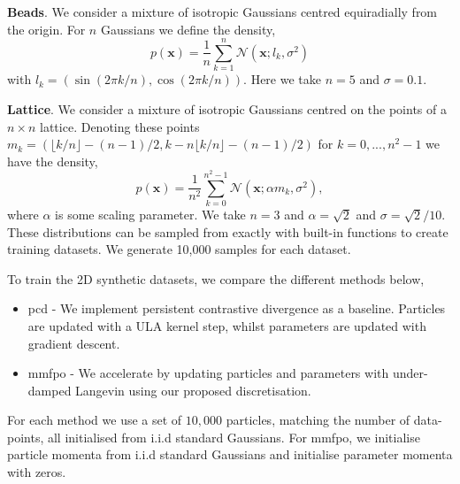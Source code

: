 \textbf{Beads}. We consider a mixture of isotropic Gaussians centred equiradially from the origin. For $n$ Gaussians we define the density,
\begin{equation*}
    p(\mathbf{x})=\frac{1}{n}\sum_{k=1}^n\mathcal{N}(\mathbf{x}; l_k,\sigma^2)
\end{equation*}
with $l_k=(\sin(2\pi k/n),\cos(2\pi k/n))$. Here we take $n=5$ and $\sigma=0.1$.

\textbf{Lattice}. We consider a mixture of isotropic Gaussians centred on the points of a $n\times n$ lattice. Denoting these points $m_k=(\lfloor k/n\rfloor-(n-1)/2,k-n\lfloor k/n\rfloor-(n-1)/2)$ for $k=0,...,n^2-1$ we have the density,
\begin{equation*}
    p(\mathbf{x})=\frac{1}{n^2}\sum_{k=0}^{n^2-1}\mathcal{N}(\mathbf{x};\alpha m_k,\sigma^2),
\end{equation*}
where $\alpha$ is some scaling parameter. We take $n=3$ and $\alpha=\sqrt{2}$ and 
$\sigma=\sqrt{2}/10$. These distributions can be sampled from exactly with built-in functions to create training datasets. We generate 10,000 samples for each dataset.

To train the 2D synthetic datasets, we compare the different methods below,
\begin{itemize}
    \item \gls*{pcd} - We implement persistent contrastive divergence as a baseline. Particles are updated with a ULA kernel step, whilst parameters are updated with gradient descent.
    \item \gls*{mmfpo} - We accelerate by updating particles and parameters with under-damped Langevin using our proposed discretisation.
\end{itemize}
For each method we use a set of $10,000$ particles, matching the number of data-points, all initialised from i.i.d standard Gaussians. For \gls*{mmfpo}, we initialise particle momenta from i.i.d standard Gaussians and initialise parameter momenta with zeros.

